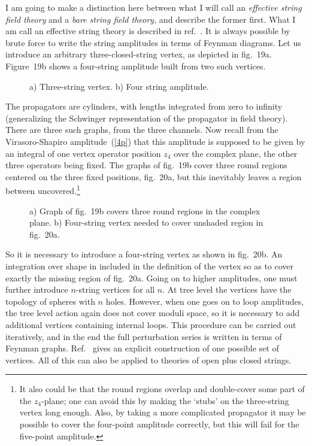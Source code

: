 I am going to make a distinction here between what I will call an
{\it effective string field theory} and a {\it bare string field theory,}
and describe the former first.  What I am call an effective string
theory is described in ref.~\cite{Zsft}.  It is always possible by
brute force to write the string amplitudes in terms of Feynman
diagrams.  Let us introduce an arbitrary three-closed-string vertex,
as depicted in fig.~19a.  Figure~19b shows a four-string amplitude
built from two such vertices.
\begin{figure}
\begin{center}
\leavevmode
{}
\end{center}
\caption[]{a) Three-string vertex. b) Four string amplitude.}
\end{figure}
The propagators are cylinders, with lengths
integrated from zero to infinity (generalizing the Schwinger
representation of the propagator in field theory).
There are three such graphs, from the three channels.  Now recall
from the Virasoro-Shapiro amplitude~(\ref{4p}) that this amplitude is
supposed to be given by an integral of one vertex operator position
$z_4$ over the complex plane, the other three operators being fixed.
The graphs of fig.~19b cover three round regions centered on
the three fixed positions, fig.~20a, but this inevitably leaves a
region between uncovered.\footnote{
It also could be that the round regions overlap and double-cover
some part of the $z_4$-plane; one can avoid this by making the
`stubs' on the three-string vertex long enough.
Also, by taking a more complicated propagator it may be possible to
cover the four-point amplitude correctly, but this will fail for the
five-point amplitude.}
\begin{figure}
\begin{center}
\leavevmode
{}
\end{center}
\caption[]{a) Graph of fig.~19b covers three round regions in the
complex plane. b) Four-string vertex needed to cover unshaded region in
fig.~20a.}
\end{figure}
So it is necessary to introduce a four-string vertex as shown in
fig.~20b.  An integration over shape in included in the definition
of the vertex so as to cover exactly the missing region of
fig.~20a.  Going on to higher amplitudes, one must further introduce
$n$-string vertices for all $n$.
At tree level the vertices have the topology of spheres with $n$
holes.  However, when one goes on to loop amplitudes, the tree level
action again does not cover moduli space, so it is necessary to add
additional vertices containing internal loops.  This procedure can be
carried out iteratively, and in the end the full perturbation series
is written in terms of Feynman graphs.  Ref.~\cite{Zsft} gives an
explicit construction of one possible set of vertices.
All of this can also be
applied to theories of open plus closed strings.

